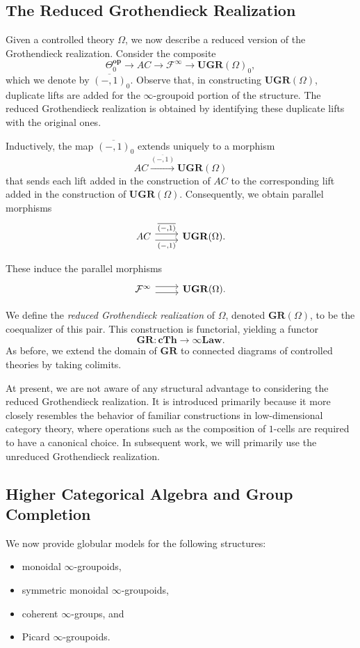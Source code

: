 \documentclass{tac}
\begin{document}
\subsection*{The Reduced Grothendieck Realization}
Given a controlled theory $\Omega$, we now describe a reduced version of the Grothendieck realization. Consider the composite
\[
\Theta_0^\mathbf{op}\to AC\to \mathcal{F}^\infty\to \mathbf{UGR}(\Omega)_0,
\]
which we denote by $\overline{(-,1)}_0$. Observe that, in constructing $\mathbf{UGR}(\Omega)$, duplicate lifts are added for the $\infty$-groupoid portion of the structure. The reduced Grothendieck realization is obtained by identifying these duplicate lifts with the original ones.

Inductively, the map $\overline{(-,1)}_0$ extends uniquely to a morphism
\[
AC\xrightarrow{\overline{(-,1)}}\mathbf{UGR}(\Omega)
\]
that sends each lift added in the construction of $AC$ to the corresponding lift added in the construction of $\mathbf{UGR}(\Omega)$. Consequently, we obtain parallel morphisms
\[
\begin{tikzcd}
	AC\ar[r,shift left=.75ex,"\overline{(-{,}1)}"]
	\ar[r,shift right=.75ex,swap,"(-{,}1)"]&
	\mathbf{UGR}(\Omega).
\end{tikzcd}
\]

These induce the parallel morphisms
\[
\begin{tikzcd}
	\mathcal{F}^{\infty}\ar[r,shift left=.75ex]
	\ar[r,shift right=.75ex,swap]&
	\mathbf{UGR}(\Omega).
\end{tikzcd}
\]

We define the \emph{reduced Grothendieck realization} of $\Omega$, denoted $\mathbf{GR}(\Omega)$,
to be the coequalizer of this pair. This construction is functorial, yielding a functor
\[
\mathbf{GR}:\mathbf{cTh}\to\infty\mathbf{Law}.
\]
As before, we extend the domain of $\mathbf{GR}$ to connected diagrams of controlled theories by taking colimits.

At present, we are not aware of any structural advantage to considering the reduced Grothendieck realization. It is introduced primarily because it more closely resembles the behavior of familiar constructions in low-dimensional category theory, where operations such as the composition of $1$-cells are required to have a canonical choice. In subsequent work, we will primarily use the unreduced Grothendieck realization.


\subsection*{Higher Categorical Algebra and Group Completion}
We now provide globular models for the following structures:
\begin{itemize}
    \item monoidal $\infty$-groupoids,
    \item symmetric monoidal $\infty$-groupoids,
    \item coherent $\infty$-groups, and
    \item Picard $\infty$-groupoids.
\end{itemize}
\end{document}
